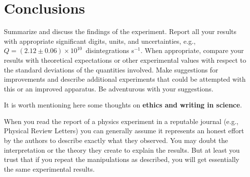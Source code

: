  
\begin{comment}


\begin{figure*}[htb]
\texttt{[image: sample-fig6]}
\caption{Sample paneled figure created in Matlab using the
subplot(2,2,x) command where x is the element of the plot array into
which all subsequent commands such as plot(x,y) and xlabel('Volts'), etc., get processed.
Use the caption space to provide more details
about the data, their acquisition or how they were processed if you do
not have sufficient room in the main body of text.  Figures can be
rotated using the angle option, see the TeX file for details.  If a
figure is to be placed after the main text use the ``figure*'' option
to make it extend over two columns, see the \LaTeX file for how this
was done.}
\label{fig:panel2x2}
\end{figure*}

\end{comment}


\section{Conclusions}

Summarize and discuss the findings of the experiment.
Report all your results with appropriate significant digits, units, and uncertainties,
e.g., $Q = (2.12 \pm 0.06)\times 10^{10}$~disintegrations s$^{-1}$. 
When appropriate, compare your results with
theoretical expectations or other experimental values
with respect to the standard deviations of the quantities involved.
Make suggestions for improvements and describe additional experiments
that could be attempted with this or an improved apparatus.
Be adventurous with your suggestions.

It is worth mentioning here some thoughts on \textbf{ethics and writing
in science}.

When you read the report of a physics experiment in a reputable
journal (e.g., Physical Review Letters) you can generally assume it
represents an honest effort by the authors to describe exactly what
they observed. You may doubt the interpretation or the theory they
create to explain the results. But at least you trust that if you
repeat the manipulations as described, you will get essentially the
same experimental results.

